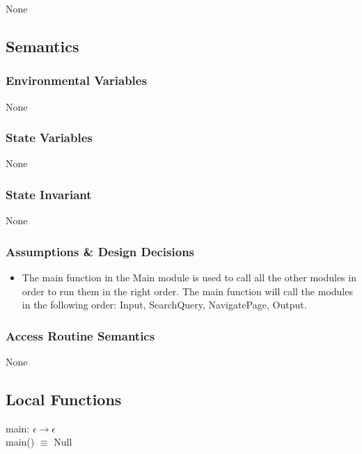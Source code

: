 \documentclass{article}
\begin{document}
None

\subsection* {Semantics}

\subsubsection* {Environmental Variables}

None

\subsubsection* {State Variables}

None

\subsubsection* {State Invariant}

None

\subsubsection* {Assumptions \& Design Decisions}

\begin{itemize}
    \item The main function in the Main module is used to call all the other modules in order to run them in the right order. The main function will call the modules in the following order: Input, SearchQuery, NavigatePage, Output.
\end{itemize}

\subsubsection* {Access Routine Semantics}

None

\subsection* {Local Functions}

\noindent main: $\epsilon \rightarrow \epsilon$  \\
main() $\equiv$ Null\\
\end{document}
